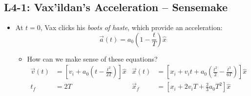 \documentclass[]{article}
\begin{document}
\begin{PresentSpace}
\vspace{-10pt}
\section*{L4-1: Vax'ildan's Acceleration -- Sensemake}
\vspace{-10pt}
\begin{itemize}
	\item At $t=0$, Vax clicks his \textit{boots of haste}, which provide an acceleration:
	\[
	\vec{a}(t) = a_{0}\left(1-\frac{t}{T}\right)\hat{x}
	\]
	\begin{itemize}
		\item How can we make sense of these equations?
		\begin{align*}
		\vec{v}(t) & = \left[v_{i}+a_{0}\left(t-\frac{t^{2}}{2T}\right)\right]\hat{x} & \vec{x}(t) & = \left[x_{i}+v_{i}t+a_{0}\left(\frac{t^{2}}{2}-\frac{t^{3}}{6T}\right)\right]\hat{x} \\
		t_{f} & = 2T & \vec{x}_{f} & = \left[x_{i}+2v_{i}T+\frac{2}{3}a_{0}T^{2}\right]\hat{x}
		\end{align*}
	\end{itemize}
\end{itemize}
\end{PresentSpace}
\newpage
\end{document}
